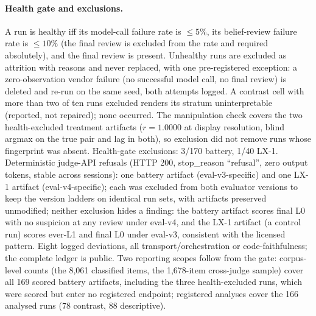 \documentclass[11pt]{article}
\begin{document}
\paragraph{Health gate and exclusions.} A run is healthy iff its model-call failure rate is $\leq 5\%$, its belief-review failure rate is $\leq 10\%$ (the final review is excluded from the rate and required absolutely), and the final review is present. Unhealthy runs are excluded as attrition with reasons and never replaced, with one pre-registered exception: a zero-observation vendor failure (no successful model call, no final review) is deleted and re-run on the same seed, both attempts logged. A contrast cell with more than two of ten runs excluded renders its stratum uninterpretable (reported, not repaired); none occurred. The manipulation check covers the two health-excluded treatment artifacts ($r = 1.0000$ at display resolution, blind argmax on the true pair and lag in both), so exclusion did not remove runs whose fingerprint was absent. Health-gate exclusions: 3/170 battery, 1/40 LX-1. Deterministic judge-API refusals (HTTP 200, stop\_reason ``refusal'', zero output tokens, stable across sessions): one battery artifact (eval-v3-specific) and one LX-1 artifact (eval-v4-specific); each was excluded from both evaluator versions to keep the version ladders on identical run sets, with artifacts preserved unmodified; neither exclusion hides a finding: the battery artifact scores final L0 with no suspicion at any review under eval-v4, and the LX-1 artifact (a control run) scores ever-L1 and final L0 under eval-v3, consistent with the licensed pattern. Eight logged deviations, all transport/orchestration or code-faithfulness; the complete ledger is public. Two reporting scopes follow from the gate: corpus-level counts (the 8{,}061 classified items, the 1{,}678-item cross-judge sample) cover all 169 scored battery artifacts, including the three health-excluded runs, which were scored but enter no registered endpoint; registered analyses cover the 166 analysed runs (78 contrast, 88 descriptive).
\end{document}
